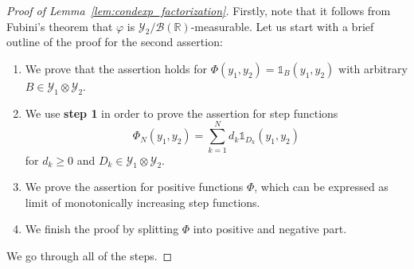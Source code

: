 \documentclass[12pt,openany]{book}
\theoremstyle{definition}
\theoremstyle{definition}
\newcommand{\cB}{\mathcal{B}}
\newcommand{\cY}{\mathcal{Y}}
\newcommand{\R}{\mathbb{R}}
\begin{document}
\begin{proof}[Proof of Lemma~\ref{lem:condexp_factorization}]
Firstly, note that it follows from Fubini's theorem that $\varphi$ is $\cY_2/\cB(\R)$-measurable. Let us start with a brief outline of the proof for the second assertion:
\begin{enumerate}[label = {\textbf{Step \arabic*.}},align=left]
\item We prove that the assertion holds for $\Phi(y_1,y_2) = \mathds{1}_B(y_1,y_2)$ with arbitrary $B\in\mathcal Y_1\otimes \mathcal Y_2$.
\item We use \textbf{step 1} in order to prove the assertion for step functions \[\Phi_N(y_1,y_2) = \sum_{k=1}^N d_k\mathds{1}_{D_k}(y_1,y_2)\] for $d_k\ge0$ and $D_k\in\mathcal Y_1\otimes\cY_2$.
\item We prove the assertion for positive functions $\Phi$, which can be expressed as limit of monotonically increasing step functions.
\item We finish the proof by splitting $\Phi$ into positive and negative part. 
\end{enumerate}

We go through all of the steps.


\end{proof}
\end{document}
